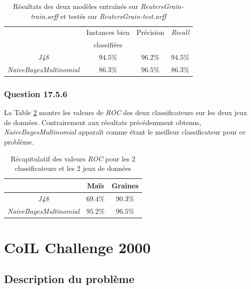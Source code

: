 \documentclass[10pt,a4paper]{article}
\begin{document}
			  \begin{table}[h]
			  	\centering
			  	\caption{Résultats des deux modèles entraînés sur \textit{ReutersGrain-train.arff} et testés sur \textit{ReutersGrain-test.arff}}
			  	\label{tab:grain}
			  	\begin{tabular}{|c|c|c|c|}
			  		\hline
			  		&Instances bien  & Précision & \textit{Recall}\\
			  		& classifiées  &  & \\ 
			  		\hline
			  		\textit{J48} & $94.5 \%$ & $96.2\%$ & $94.5\%$ \\
			  		\hline
			  		\textit{NaiveBayesMultinomial}& $86.3\%$ & $96.5\%$ & $86.3\%$ \\
			  		\hline
			  	\end{tabular}
			  \end{table}
			  
			  \subsubsection*{Question 17.5.6}
			  
			  La Table \ref{tab:text:ROC} montre les valeurs de \textit{ROC} des deux classificateurs sur les deux jeux de données. Contrairement aux résultats précédemment obtenus, \textit{NaiveBayesMultinomial} apparaît comme étant le meilleur classificateur pour ce problème.
			  
			  \begin{table}[h]
			  	\centering
			  	\caption{Récapitulatif des valeurs \textit{ROC} pour les 2 classificateurs et les 2 jeux de données}
			  	\label{tab:text:ROC}
			  	\begin{tabular}{|c|c|c|}
			  		\hline
			  		& Maïs & Graines \\
			  		\hline
			  		\textit{J48} & $69.4\%$ & $90.3\%$\\
			  		\hline
			  		\textit{NaiveBayesMultinomial} & $95.2\%$ & $96.5\%$\\
			  		\hline
			  	\end{tabular}
			  \end{table}
   	
   	\section{CoIL Challenge 2000}
   	
	   	\subsection{Description du problème}
	   	
\end{document}
